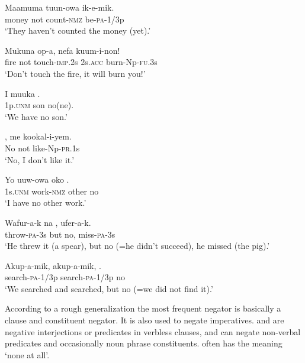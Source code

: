 \ea%
\label{ex:x654}
\gll Maamuma  tuun-owa ik-e-mik. \\
money not count-\textsc{nmz} be-\textsc{pa}-1/3p\\
\glt`They haven't counted the money (yet).'
\z

\ea%
\label{ex:x1112}
\gll Mukuna  op-a, nefa kuum-i-non! \\
fire not touch-\textsc{imp}.2s 2s.\textsc{acc} burn-Np-\textsc{fu}.3s\\
\glt`Don't touch the fire, it will burn you!'
\z

\ea%
\label{ex:x655}
\gll I muuka . \\
1p.\textsc{unm} son no(ne).\\
\glt`We have no son.'
\z

\ea%
\label{ex:x707}
\gll {}, me kookal-i-yem. \\
No not like-Np-\textsc{pr}.1s \\
\glt`No, I don't like it.'
\z

\ea%
\label{ex:x1212}
\gll Yo uuw-owa oko . \\
1s.\textsc{unm} work-\textsc{nmz} other no\\
\glt`I have no other work.'
\z

\ea%
\label{ex:x705}
\gll Wafur-a-k na , ufer-a-k. \\
throw-\textsc{pa}-3s but no, miss-\textsc{pa}-3s\\
\glt`He threw it (a spear), but no (=he didn't succeed), he missed (the pig).'
\z

\ea%
\label{ex:x1111}
\gll Akup-a-mik, akup-a-mik, . \\
search-\textsc{pa}-1/3p search-\textsc{pa}-1/3p no\\
\glt`We searched and searched, but no (=we did not find it).'
\z

According to a rough generalization the most frequent negator  is basically a clause and constituent negator. It is also used to negate imperatives.  and  are negative interjections or predicates in verbless clauses, and  can negate non-verbal predicates and occasionally noun phrase constituents.  often has the meaning `none at all'.

